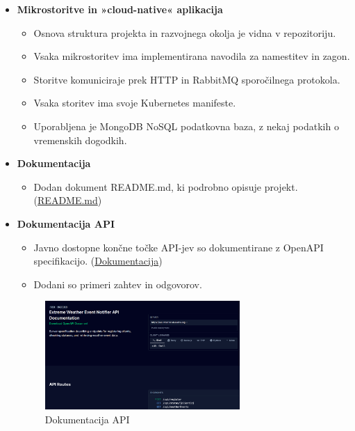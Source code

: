 \documentclass[a4paper,11pt]{article}
\begin{document}
\begin{itemize}
	\item \textbf{Mikrostoritve in »cloud-native« aplikacija}
	      \begin{itemize}
	      	\item Osnova struktura projekta in razvojnega okolja je vidna v repozitoriju.
	      	\item Vsaka mikrostoritev ima implementirana navodila za namestitev in zagon.
	      	\item Storitve komuniciraje prek HTTP in RabbitMQ sporočilnega protokola.
	      	\item Vsaka storitev ima svoje Kubernetes manifeste.
	      	\item Uporabljena je MongoDB NoSQL podatkovna baza, z nekaj podatkih o vremenskih dogodkih.
	      \end{itemize}
	\item \textbf{Dokumentacija}
	      \begin{itemize}
	      	\item Dodan dokument README.md, ki podrobno opisuje projekt. (\href{https://github.com/rso2425/extreme-weather-event-notifier/blob/main/README.md}{README.md})
	      \end{itemize}
	\item \textbf{Dokumentacija API}
	      \begin{itemize}
	      	\item Javno dostopne končne točke API-jev so dokumentirane z OpenAPI specifikacijo. (\href{https://rso-weather.duckdns.org/docs/tag/api-routes}{Dokumentacija})
	      	\item Dodani so primeri zahtev in odgovorov.
	      \end{itemize}
	      
	      \begin{figure}[h!]
	      	\centering
	      	\includegraphics[width=0.7\textwidth]{images/openapi.png}
	      	\caption{Dokumentacija API}
	      	\label{fig:openapi}
	      \end{figure}
	              

\end{itemize}
\end{document}
